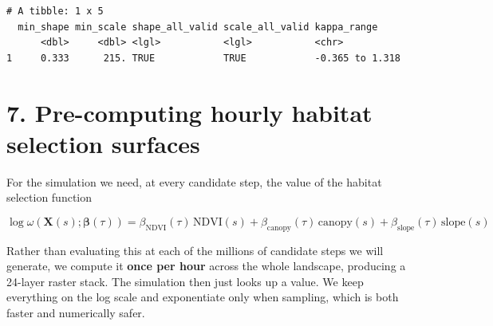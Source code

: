 \documentclass[
  letterpaper,
  DIV=11,
  numbers=noendperiod]{scrartcl}
\begin{document}
\begin{verbatim}
# A tibble: 1 x 5
  min_shape min_scale shape_all_valid scale_all_valid kappa_range    
      <dbl>     <dbl> <lgl>           <lgl>           <chr>          
1     0.333      215. TRUE            TRUE            -0.365 to 1.318
\end{verbatim}

\section{7. Pre-computing hourly habitat selection
surfaces}\label{pre-computing-hourly-habitat-selection-surfaces}

For the simulation we need, at every candidate step, the value of the
habitat selection function

\[
\log \omega(\mathbf{X}(s); \boldsymbol{\beta}(\tau)) = \beta_{\text{NDVI}}(\tau)\,\text{NDVI}(s) + \beta_{\text{canopy}}(\tau)\,\text{canopy}(s) + \beta_{\text{slope}}(\tau)\,\text{slope}(s)
\]

Rather than evaluating this at each of the millions of candidate steps
we will generate, we compute it \textbf{once per hour} across the whole
landscape, producing a 24-layer raster stack. The simulation then just
looks up a value. We keep everything on the log scale and exponentiate
only when sampling, which is both faster and numerically safer.
\end{document}
